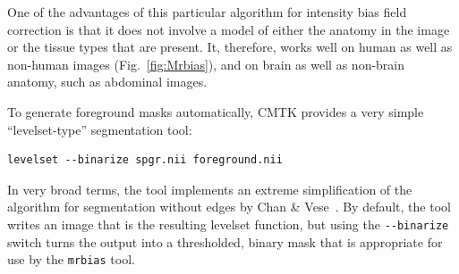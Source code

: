 \documentclass{InsightArticle}
\begin{document}
One of the advantages of this particular algorithm for intensity bias field
correction is that it does not involve a model of either the anatomy in the
image or the tissue types that are present. It, therefore, works well on human
as well as non-human images (Fig.~\ref{fig:Mrbias}), and on brain as well as
non-brain anatomy, such as abdominal images.

To generate foreground masks automatically, CMTK provides a very simple
``levelset-type'' segmentation tool:
\begin{verbatim}
levelset --binarize spgr.nii foreground.nii
\end{verbatim}
In very broad terms, the tool implements an extreme simplification of the
algorithm for segmentation without edges by Chan \&
Vese~\cite{ChanVese:2001}. By default, the tool writes an image that is the
resulting levelset function, but using the \verb|--binarize| switch turns the
output into a thresholded, binary mask that is appropriate for use by the
\verb|mrbias| tool.
\end{document}
